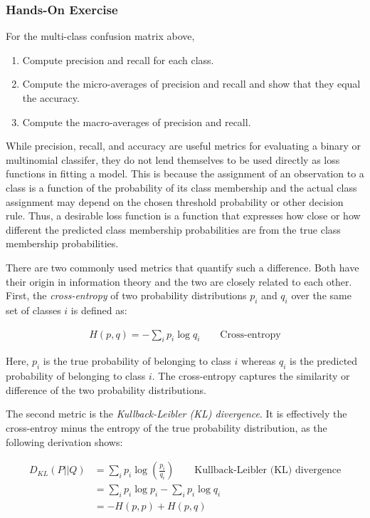 \begin{tcolorbox}[colback=code]
\subsubsection*{Hands-On Exercise}

For the multi-class confusion matrix above,
\begin{enumerate}
  \item Compute precision and recall for each class.
  \item Compute the micro-averages of precision and recall and show that they equal the accuracy.
  \item Compute the macro-averages of precision and recall.
\end{enumerate}
\end{tcolorbox}

While precision, recall, and accuracy are useful metrics for evaluating a binary or multinomial classifer, they do not lend themselves to be used directly as loss functions in fitting a model. This is because the assignment of an observation to a class is a function of the probability of its class membership and the actual class assignment may depend on the chosen threshold probability or other decision rule. Thus, a desirable loss function is a function that expresses how close or how different the predicted class membership probabilities are from the true class membership probabilities. 

There are two commonly used metrics that quantify such a difference. Both have their origin in information theory and the two are closely related to each other. First, the \emph{cross-entropy} of two probability distributions $p_i$ and $q_i$ over the same set of classes $i$ is defined as:

\begin{align*}
H(p, q) = - \sum_i p_i \log q_i \qquad \text{Cross-entropy}
\end{align*}

\noindent Here, $p_i$ is the true probability of belonging to class $i$ whereas $q_i$ is the predicted probability of belonging to class $i$. The cross-entropy captures the similarity or difference of the two probability distributions.

The second metric is the \emph{Kullback-Leibler (KL) divergence}. It is effectively the cross-entroy minus the entropy of the true probability distribution, as the following derivation shows:

\begin{align*}
D_{KL}(P || Q) &= \sum_i p_i \log \left( \frac{p_i}{q_i} \right) \qquad \text{Kullback-Leibler (KL) divergence}\\
  & = \sum_i p_i \log p_i - \sum_i p_i \log q_i \\
  & = - H(p, p) + H(p, q)
\end{align*}

